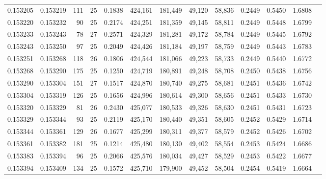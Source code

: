 \begin{tabular}{rrrrrrrrrrrrr}
0.153205 & 0.153219 & 111 &  25 &                                     0.1838 & 424,161 & 181,449 &  49,120 &  58,836 & 0.2449 & 0.5450 & 1.6808 \\
0.153220 & 0.153232 &  90 &  25 &                                     0.2174 & 424,251 & 181,359 &  49,145 &  58,811 & 0.2449 & 0.5448 & 1.6799 \\
0.153233 & 0.153243 &  78 &  27 &                                     0.2571 & 424,329 & 181,281 &  49,172 &  58,784 & 0.2449 & 0.5445 & 1.6792 \\
0.153243 & 0.153250 &  97 &  25 &                                     0.2049 & 424,426 & 181,184 &  49,197 &  58,759 & 0.2449 & 0.5443 & 1.6783 \\
0.153251 & 0.153268 & 118 &  26 &                                     0.1806 & 424,544 & 181,066 &  49,223 &  58,733 & 0.2449 & 0.5440 & 1.6772 \\
0.153268 & 0.153290 & 175 &  25 &                                     0.1250 & 424,719 & 180,891 &  49,248 &  58,708 & 0.2450 & 0.5438 & 1.6756 \\
0.153290 & 0.153304 & 151 &  27 &                                     0.1517 & 424,870 & 180,740 &  49,275 &  58,681 & 0.2451 & 0.5436 & 1.6742 \\
0.153304 & 0.153319 & 126 &  25 &                                     0.1656 & 424,996 & 180,614 &  49,300 &  58,656 & 0.2451 & 0.5433 & 1.6730 \\
0.153320 & 0.153329 &  81 &  26 &                                     0.2430 & 425,077 & 180,533 &  49,326 &  58,630 & 0.2451 & 0.5431 & 1.6723 \\
0.153329 & 0.153344 &  93 &  25 &                                     0.2119 & 425,170 & 180,440 &  49,351 &  58,605 & 0.2452 & 0.5429 & 1.6714 \\
0.153344 & 0.153361 & 129 &  26 &                                     0.1677 & 425,299 & 180,311 &  49,377 &  58,579 & 0.2452 & 0.5426 & 1.6702 \\
0.153361 & 0.153382 & 181 &  25 &                                     0.1214 & 425,480 & 180,130 &  49,402 &  58,554 & 0.2453 & 0.5424 & 1.6686 \\
0.153383 & 0.153394 &  96 &  25 &                                     0.2066 & 425,576 & 180,034 &  49,427 &  58,529 & 0.2453 & 0.5422 & 1.6677 \\
0.153394 & 0.153409 & 134 &  25 &                                     0.1572 & 425,710 & 179,900 &  49,452 &  58,504 & 0.2454 & 0.5419 & 1.6664 \\

\end{tabular}
